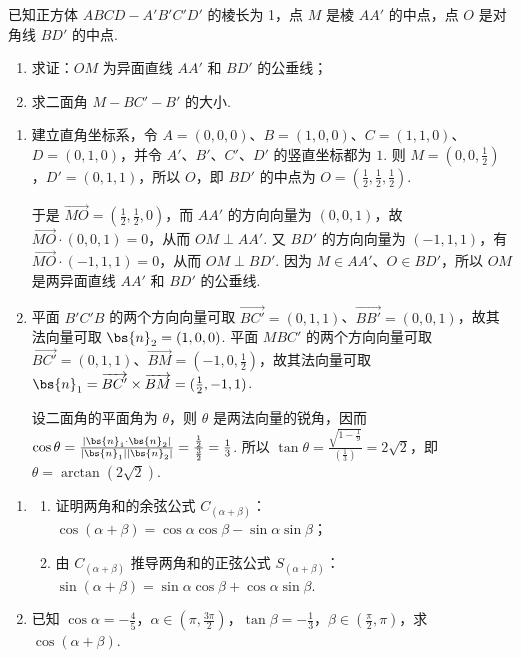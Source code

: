 \begin{problem}
已知正方体 \(ABCD - A'B'C'D'\) 的棱长为 1，点 \(M\) 是棱 \(AA'\) 的中点，点 \(O\) 是对角线 \(BD'\) 的中点.

\begin{enumerate}
\item 求证：\(OM\) 为异面直线 \(AA'\) 和 \(BD'\) 的公垂线；
\item 求二面角 \(M - BC' - B'\) 的大小.
\end{enumerate}

\end{problem}

\begin{solution}
\begin{enumerate}
\item 建立直角坐标系，令 \(A=(0,0,0)\)、\(B=(1,0,0)\)、\(C=(1,1,0)\)、\(D=(0,1,0)\)，并令 \(A'\)、\(B'\)、\(C'\)、\(D'\) 的竖直坐标都为 \(1\). 则 \(M=(0,0,\frac12)\)，\(D'=(0,1,1)\)，所以 \(O\)，即 \(BD'\) 的中点为 \(O=(\frac12,\frac12,\frac12)\).

于是 \(\overrightarrow{MO}=(\frac12,\frac12,0)\)，而 \(AA'\) 的方向向量为 \((0,0,1)\)，故 \(\overrightarrow{MO}\cdot(0,0,1)=0\)，从而 \(OM\perp AA'\). 又 \(BD'\) 的方向向量为 \((-1,1,1)\)，有 \(\overrightarrow{MO}\cdot(-1,1,1)=0\)，从而 \(OM\perp BD'\). 因为 \(M\in AA'\)、\(O\in BD'\)，所以 \(OM\) 是两异面直线 \(AA'\) 和 \(BD'\) 的公垂线.
\item 平面 \(B'C'B\) 的两个方向向量可取 \(\overrightarrow{BC'}=(0,1,1)\)、\(\overrightarrow{BB'}=(0,0,1)\)，故其法向量可取 \(\bs{n}_2=(1,0,0)\). 平面 \(MBC'\) 的两个方向向量可取 \(\overrightarrow{BC'}=(0,1,1)\)、\(\overrightarrow{BM}=(-1,0,\frac12)\)，故其法向量可取
\(\bs{n}_1=\overrightarrow{BC'}\times\overrightarrow{BM}=(\frac12,-1,1)\).

设二面角的平面角为 \(\theta\)，则 \(\theta\) 是两法向量的锐角，因而
\(\cos\theta=\frac{|\bs{n}_1\cdot\bs{n}_2|}{|\bs{n}_1||\bs{n}_2|}=\frac{\frac{1}{2}}{\frac{3}{2}}=\frac13\). 所以 \(\tan\theta=\frac{\sqrt{1-\frac19}}{(\frac13)}=2\sqrt2\)，即 \(\theta=\arctan(2\sqrt2)\).
\end{enumerate}
\end{solution}

\begin{problem}
\begin{enumerate}
\item
\begin{enumerate}
\item 证明两角和的余弦公式 \(C_{(\alpha+\beta)}\)：\(\cos (\alpha + \beta) = \cos \alpha \cos \beta - \sin \alpha \sin \beta\)；
\item 由 \(C_{(\alpha+\beta)}\) 推导两角和的正弦公式 \(S_{(\alpha+\beta)}\)：\(\sin (\alpha + \beta) = \sin \alpha \cos \beta + \cos \alpha \sin \beta\).
\end{enumerate}
\item 已知 \(\cos \alpha = -\frac{4}{5}\)，\(\alpha \in \left(\pi, \frac{3\pi}{2}\right)\)，\(\tan \beta = -\frac{1}{3}\)，\(\beta \in \left(\frac{\pi}{2}, \pi\right)\)，求 \(\cos (\alpha + \beta)\).
\end{enumerate}
\end{problem}

